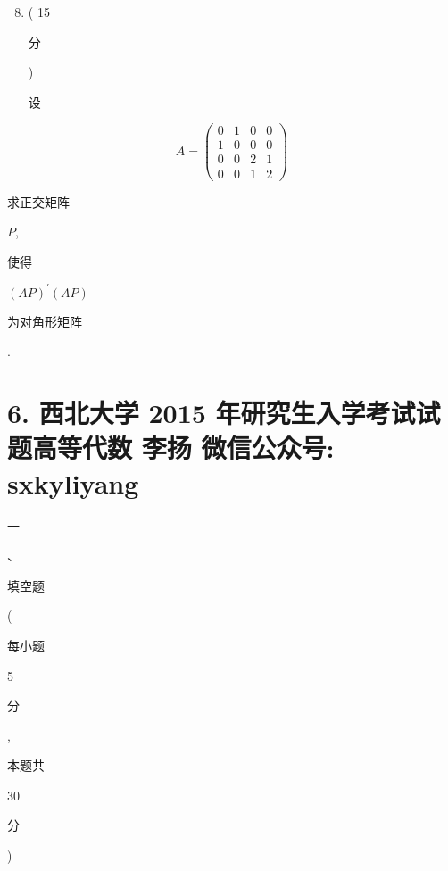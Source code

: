 \documentclass[10pt]{article}
\begin{document}
\begin{enumerate}
  \setcounter{enumi}{7}
  \item ( 15 \begin{CJK}{UTF8}{mj}分\end{CJK}) \begin{CJK}{UTF8}{mj}设\end{CJK}
\end{enumerate}
$$
A=\left(\begin{array}{llll}
0 & 1 & 0 & 0 \\
1 & 0 & 0 & 0 \\
0 & 0 & 2 & 1 \\
0 & 0 & 1 & 2
\end{array}\right)
$$
\begin{CJK}{UTF8}{mj}求正交矩阵\end{CJK} $P$, \begin{CJK}{UTF8}{mj}使得\end{CJK} $(A P)^{\prime}(A P)$ \begin{CJK}{UTF8}{mj}为对角形矩阵\end{CJK}.

\section{6. 西北大学 2015 年研究生入学考试试题高等代数 
 李扬 
 微信公众号: sxkyliyang}
\begin{CJK}{UTF8}{mj}一\end{CJK}、\begin{CJK}{UTF8}{mj}填空题\end{CJK} (\begin{CJK}{UTF8}{mj}每小题\end{CJK} 5 \begin{CJK}{UTF8}{mj}分\end{CJK}, \begin{CJK}{UTF8}{mj}本题共\end{CJK} 30 \begin{CJK}{UTF8}{mj}分\end{CJK})
\end{document}
